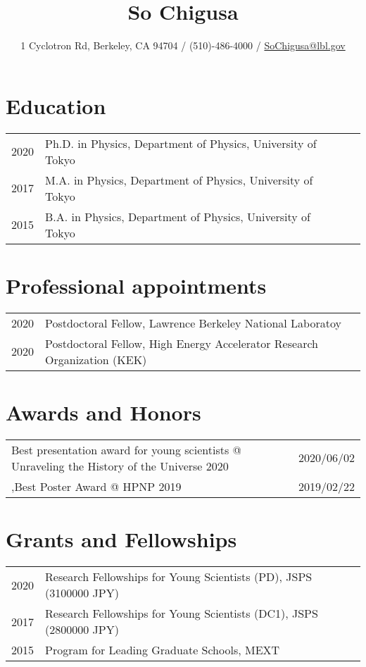 \documentclass[12pt]{article}
\title{{\Large So Chigusa}}
\author{1 Cyclotron Rd, Berkeley, CA 94704 / (510)-486-4000 / \href{mailto:SoChigusa@lbl.gov}{SoChigusa@lbl.gov}}
\date{\vspace{-.5in}}
\begin{document}
\maketitle

\section*{Education}
\begin{table}[h]
 \begin{tabular}{llll}
  2020 & Ph.D. in Physics, Department of Physics, University of Tokyo \\
  2017 & M.A. in Physics, Department of Physics, University of Tokyo \\
  2015 & B.A. in Physics, Department of Physics, University of Tokyo
 \end{tabular}
\end{table}

\section*{Professional appointments}
\begin{table}[h]
  \begin{tabular}{ll}
    2020 & Postdoctoral Fellow, Lawrence Berkeley National Laboratoy \\
    2020 & Postdoctoral Fellow, High Energy Accelerator Research Organization (KEK)
  \end{tabular}
\end{table}

\section*{Awards and Honors}
\begin{table}[h]\begin{tabular}{ll}Best presentation award for young scientists @ Unraveling the History of the Universe 2020 & 2020/06/02 \\,Best Poster Award @ HPNP 2019 & 2019/02/22 \\\end{tabular}\end{table}

\section*{Grants and Fellowships}
\begin{table}[H]
  \begin{tabular}{ll}
    2020 & Research Fellowships for Young Scientists (PD), JSPS (3100000 JPY) \\
    2017 & Research Fellowships for Young Scientists (DC1), JSPS (2800000 JPY) \\
    2015 & Program for Leading Graduate Schools, MEXT
  \end{tabular}
\end{table}
\end{document}
